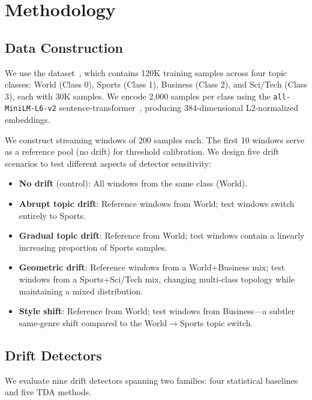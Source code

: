 \section{Methodology}
\label{sec:method}

\subsection{Data Construction}
\label{sec:data}

We use the \agnews dataset~\cite{zhang2015character}, which contains 120K training samples across four topic classes: World (Class 0), Sports (Class 1), Business (Class 2), and Sci/Tech (Class 3), each with 30K samples. We encode 2{,}000 samples per class using the \texttt{all-MiniLM-L6-v2} sentence-transformer~\cite{reimers2019sentence}, producing 384-dimensional L2-normalized embeddings.

We construct streaming windows of 200 samples each. The first 10 windows serve as a reference pool (no drift) for threshold calibration. We design five drift scenarios to test different aspects of detector sensitivity:

\begin{itemize}[leftmargin=*,itemsep=2pt,topsep=2pt]
    \item \textbf{No drift} (control): All windows from the same class (World).
    \item \textbf{Abrupt topic drift}: Reference windows from World; test windows switch entirely to Sports.
    \item \textbf{Gradual topic drift}: Reference from World; test windows contain a linearly increasing proportion of Sports samples.
    \item \textbf{Geometric drift}: Reference windows from a World+Business mix; test windows from a Sports+Sci/Tech mix, changing multi-class topology while maintaining a mixed distribution.
    \item \textbf{Style shift}: Reference from World; test windows from Business---a subtler same-genre shift compared to the World$\to$Sports topic switch.
\end{itemize}

\subsection{Drift Detectors}
\label{sec:detectors}

We evaluate nine drift detectors spanning two families: four statistical baselines and five TDA methods.

